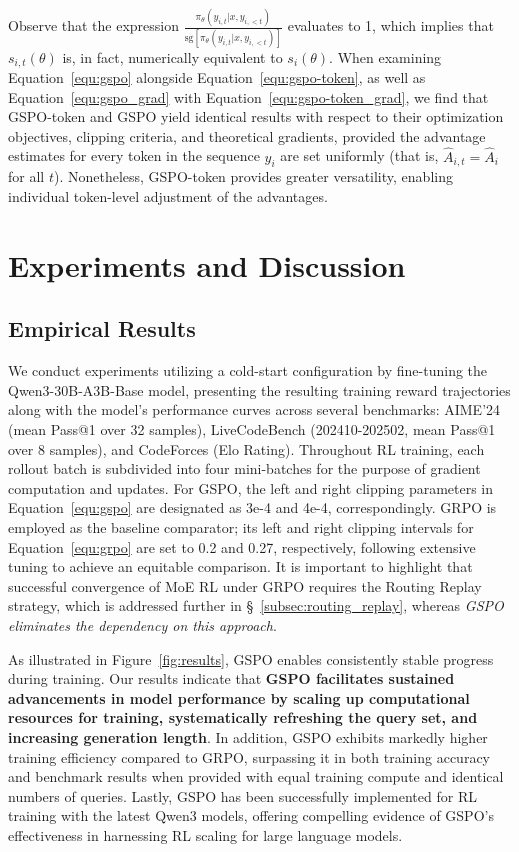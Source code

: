 Observe that the expression $\frac{ \pi_{\theta} (y_{i,t} | x, y_{i,<t}) }{ \mathrm{sg} \left[ \pi_{\theta} (y_{i,t} | x, y_{i,<t}) \right] }$ evaluates to 1, which implies that $s_{i,t}(\theta)$ is, in fact, numerically equivalent to $s_{i}(\theta)$. When examining Equation~\eqref{equ:gspo} alongside Equation~\eqref{equ:gspo-token}, as well as Equation~\eqref{equ:gspo_grad} with Equation~\eqref{equ:gspo-token_grad}, we find that GSPO-token and GSPO yield identical results with respect to their optimization objectives, clipping criteria, and theoretical gradients, provided the advantage estimates for every token in the sequence $y_i$ are set uniformly (that is, $\widehat{A}_{i,t} = \widehat{A}_{i}$ for all $t$). Nonetheless, GSPO-token provides greater versatility, enabling individual token-level adjustment of the advantages.

\section{Experiments and Discussion}

\subsection{Empirical Results}

We conduct experiments utilizing a cold-start configuration by fine-tuning the Qwen3-30B-A3B-Base model, presenting the resulting training reward trajectories along with the model's performance curves across several benchmarks: AIME'24 (mean Pass@1 over 32 samples), LiveCodeBench (202410-202502, mean Pass@1 over 8 samples), and CodeForces (Elo Rating). Throughout RL training, each rollout batch is subdivided into four mini-batches for the purpose of gradient computation and updates. For GSPO, the left and right clipping parameters in Equation~\eqref{equ:gspo} are designated as 3e-4 and 4e-4, correspondingly. GRPO is employed as the baseline comparator; its left and right clipping intervals for Equation~\eqref{equ:grpo} are set to 0.2 and 0.27, respectively, following extensive tuning to achieve an equitable comparison. It is important to highlight that successful convergence of MoE RL under GRPO requires the Routing Replay strategy, which is addressed further in \S~\ref{subsec:routing_replay}, whereas \textit{GSPO eliminates the dependency on this approach}.

As illustrated in Figure~\ref{fig:results}, GSPO enables consistently stable progress during training. Our results indicate that \textbf{GSPO facilitates sustained advancements in model performance by scaling up computational resources for training, systematically refreshing the query set, and increasing generation length}. In addition, GSPO exhibits markedly higher training efficiency compared to GRPO, surpassing it in both training accuracy and benchmark results when provided with equal training compute and identical numbers of queries. Lastly, GSPO has been successfully implemented for RL training with the latest Qwen3 models, offering compelling evidence of GSPO’s effectiveness in harnessing RL scaling for large language models.


